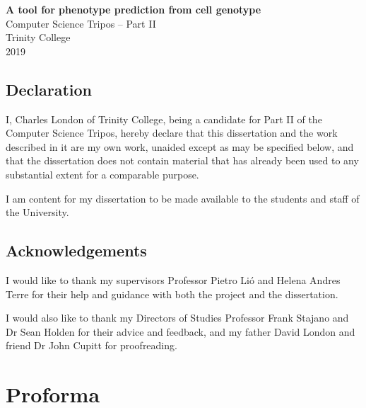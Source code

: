 \documentclass[12pt,a4paper,twoside,openany]{report}
\begin{document}

\pagestyle{empty}


\vspace*{60mm}
\begin{center}
\Huge
\textbf{A tool for phenotype prediction from cell genotype} \\[5mm]
Computer Science Tripos -- Part II \\[5mm]
Trinity College \\[5mm]
2019 %
\end{center}


\pagestyle{plain}
 
\newpage
\section*{Declaration}

I, Charles London of Trinity College, being a candidate for Part II of the Computer
Science Tripos, hereby declare
that this dissertation and the work described in it are my own work,
unaided except as may be specified below, and that the dissertation
does not contain material that has already been used to any substantial
extent for a comparable purpose. 

I am content for my dissertation to be made available to the students and staff of the University.

\bigskip
{}

\medskip
{}

\section*{Acknowledgements}

I would like to thank my supervisors Professor Pietro Li\'o and Helena Andres Terre for their help and guidance with both the project and the dissertation.

I would also like to thank my Directors of Studies Professor Frank Stajano and Dr Sean Holden for their advice and feedback,
and my father David London and friend Dr John Cupitt for proofreading. 

\chapter*{Proforma}
\end{document}

